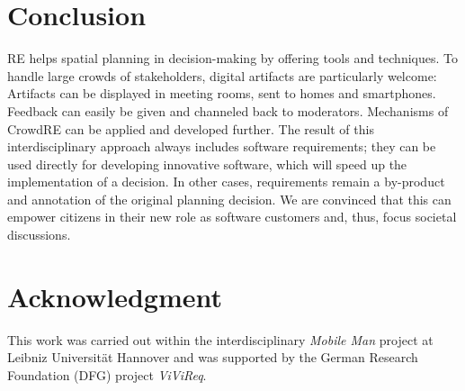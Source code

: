 \documentclass[conference]{IEEEtran}
\begin{document}
\section{Conclusion}
\label{ch:7}
RE helps spatial planning in decision-making by offering tools and techniques. 
To handle large crowds of stakeholders, digital artifacts are particularly 
welcome: Artifacts can be displayed in meeting rooms, sent to homes and 
smartphones. Feedback can easily be given and channeled back to moderators. 
Mechanisms of CrowdRE can be applied and developed further. The result of this 
interdisciplinary approach always includes software requirements; they can be 
used directly for developing innovative software, which will speed up the 
implementation of a decision. In other cases, requirements remain a by-product 
and annotation of the original planning decision. We are convinced that this 
can empower citizens in their new role as software customers and, thus, focus 
societal discussions.

\section*{Acknowledgment}
This work was carried out within the interdisciplinary \textit{Mobile Man} 
project at Leibniz Universität Hannover and was supported by the 
German Research Foundation (DFG) project \textit{ViViReq}.



\end{document}
